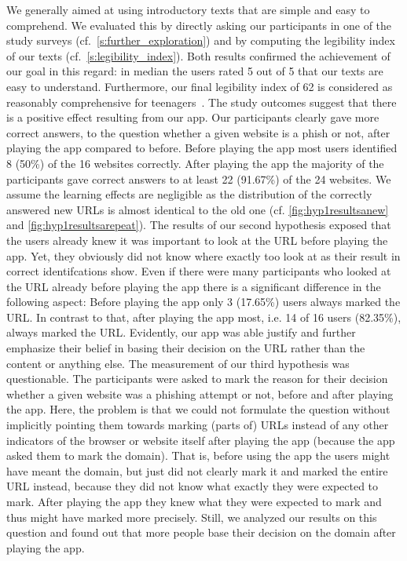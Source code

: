 We generally aimed at using introductory texts that are simple and easy to comprehend.
We evaluated this by directly asking our participants in one of the study surveys (cf.~\autoref{s:further_exploration}) and by computing the legibility index of our texts (cf.~\autoref{s:legibility_index}). Both results confirmed the achievement of our goal in this regard: in median the users rated 5 out of 5 that our texts are easy to understand. Furthermore, our final legibility index of 62 is considered as reasonably comprehensive for teenagers~\cite{amstad1978verstandlich}.
The study outcomes suggest that there is a positive effect resulting from our app.
Our participants clearly gave more correct answers, to the question whether a given website is a phish or not, after playing the app compared to before.
Before playing the app most users identified 8 (50\%) of the 16 websites correctly.
After playing the app the majority of the participants gave correct answers to at least 22 (91.67\%) of the 24 websites.
We assume the learning effects are negligible as the distribution of the correctly answered new URLs is almost identical to the old one (cf. \autoref{fig:hyp1resultsanew} and \autoref{fig:hyp1resultsarepeat}).
The results of our second hypothesis exposed that the users already knew it was important to look at the URL before playing the app.
Yet, they obviously did not know where exactly too look at as their result in correct identifcations show.
Even if there were many participants who looked at the URL already before playing the app there is a significant difference in the following aspect:
Before playing the app only 3 (17.65\%) users always marked the URL.
In contrast to that, after playing the app most, i.e. 14 of 16 users (82.35\%), always marked the URL.
Evidently, our app was able justify and further emphasize their belief in basing their decision on the URL rather than the content or anything else.
The measurement of our third hypothesis was questionable.
The participants were asked to mark the reason for their decision whether a given website was a phishing attempt or not, before and after playing the app. 
Here, the problem is that we could not formulate the question without implicitly pointing them towards marking (parts of) URLs instead of any other indicators of the browser or website itself after playing the app (because the app asked them to mark the domain). That is, before using the app the users might have meant the domain, but just did not clearly mark it and marked the entire URL instead, because they did not know what exactly they were expected to mark. 
After playing the app they knew what they were expected to mark and thus might have marked more precisely.
Still, we analyzed our results on this question and found out that more people base their decision on the domain after playing the app.

